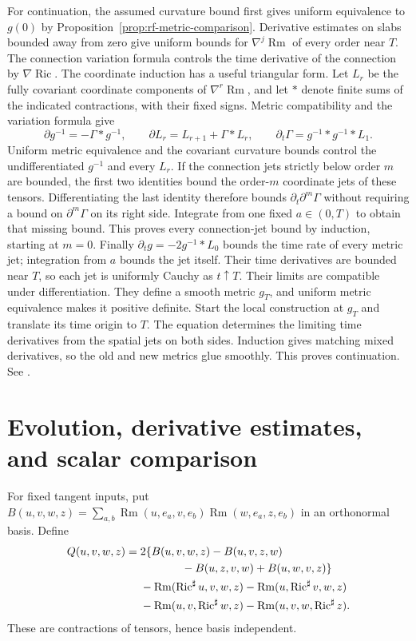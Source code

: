 For continuation, the assumed curvature bound first gives uniform
equivalence to $g(0)$ by Proposition~\ref{prop:rf-metric-comparison}.
Derivative estimates on slabs bounded away from zero give uniform bounds
for $\nabla^j\operatorname{Rm}$ of every order near $T$.  The connection
variation formula controls the time derivative of the connection by
$\nabla\operatorname{Ric}$.  The coordinate induction has a useful
triangular form.  Let $L_r$ be the fully covariant coordinate components
of $\nabla^r\operatorname{Rm}$, and let $*$ denote finite sums
of the indicated contractions, with their fixed signs.
Metric compatibility and the variation formula give
\[
 \partial g^{-1}=-\Gamma*g^{-1},\qquad
 \partial L_r=L_{r+1}+\Gamma*L_r,
 \qquad \partial_t\Gamma=g^{-1}*g^{-1}*L_1.
\]
Uniform metric equivalence and the covariant curvature bounds control
the undifferentiated $g^{-1}$ and every $L_r$.  If the connection jets
strictly below order $m$ are bounded, the first two identities bound
the order-$m$ coordinate jets of these tensors.  Differentiating the
last identity therefore bounds $\partial_t\partial^m\Gamma$
without requiring a bound on $\partial^m\Gamma$ on its right side.
Integrate from one fixed $a\in(0,T)$ to obtain that missing bound.
This proves every connection-jet bound by induction, starting at
$m=0$.  Finally $\partial_tg=-2g^{-1}*L_0$ bounds the time rate
of every metric jet; integration from $a$ bounds the jet itself.
Their time derivatives are
bounded near $T$, so each jet is uniformly Cauchy as $t\uparrow T$.
Their limits are compatible under differentiation.  They define a smooth
metric $g_T$, and uniform metric equivalence makes it positive definite.
Start the local construction at $g_T$ and translate its time origin to
$T$.  The equation determines the limiting time derivatives from the
spatial jets on both sides.  Induction gives matching mixed derivatives,
so the old and new metrics glue smoothly.  This proves continuation.
See \cite[Proposition 3.12, p.~40; Proposition 4.12, p.~68]{MT2007}.

\section{Evolution, derivative estimates, and scalar comparison}
\label{sec:rf-curvature}

For fixed tangent inputs, put
$B(u,v,w,z)=\sum_{a,b}\operatorname{Rm}(u,e_a,v,e_b)
                         \operatorname{Rm}(w,e_a,z,e_b)$
in an orthonormal basis.  Define
\[
\begin{split}
 Q(u,v,w,z)={}&2\{B(u,v,w,z)-B(u,v,z,w)\\
              &\hspace{13mm}-B(u,z,v,w)+B(u,w,v,z)\}\\
 &-\operatorname{Rm}(\operatorname{Ric}^{\sharp}u,v,w,z)
  -\operatorname{Rm}(u,\operatorname{Ric}^{\sharp}v,w,z)\\
 &-\operatorname{Rm}(u,v,\operatorname{Ric}^{\sharp}w,z)
  -\operatorname{Rm}(u,v,w,\operatorname{Ric}^{\sharp}z).
\end{split}
\]
These are contractions of tensors, hence basis independent.

